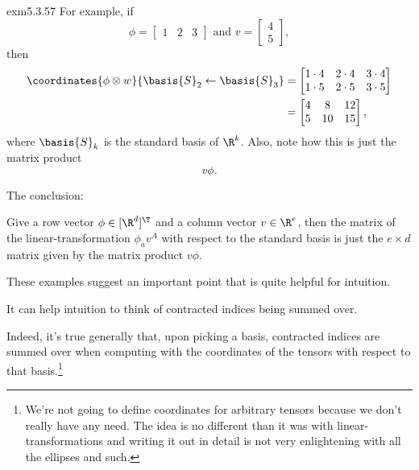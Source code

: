 \begin{exm}{}{exm5.3.57}
	For example, if
	\begin{equation}
		\phi =\begin{bmatrix}1 & 2 & 3\end{bmatrix}\text{ and }v=\begin{bmatrix}4 \\ 5\end{bmatrix},
	\end{equation}
	then
	\begin{equation}
		\begin{split}
		\coordinates{\phi \otimes w}{\basis{S}_2\leftarrow \basis{S}_3} & =\begin{bmatrix}1\cdot 4 & 2\cdot 4 & 3\cdot 4 \\ 1\cdot 5 & 2\cdot 5 & 3\cdot 5\end{bmatrix} \\
		& =\begin{bmatrix}4 & 8 & 12 \\ 5 & 10 & 15\end{bmatrix},
		\end{split}
	\end{equation}
	where $\basis{S}_k$ is the standard basis of $\R ^k$.  Also, note how this is just the matrix product
	\begin{equation}
		v\phi .
	\end{equation}
	
	The conclusion:
	\begin{important}
		Give a row vector $\phi \in [\R ^d]^{\T}$ and a column vector $v\in \R ^e$, then the matrix of the linear-transformation $\phi _av^A$ with respect to the standard basis is just the $e\times d$ matrix given by the matrix product $v\phi$.
	\end{important}
\end{exm}

These examples suggest an important point that is quite helpful for intuition.
\begin{important}
	It can help intuition to think of contracted indices being summed over.
\end{important}
Indeed, it's true generally that, upon picking a basis, contracted indices are summed over when computing with the coordinates of the tensors with respect to that basis.\footnote{We're not going to define coordinates for arbitrary tensors because we don't really have any need.  The idea is no different than it was with linear-transformations and writing it out in detail is not very enlightening with all the ellipses and such.}

